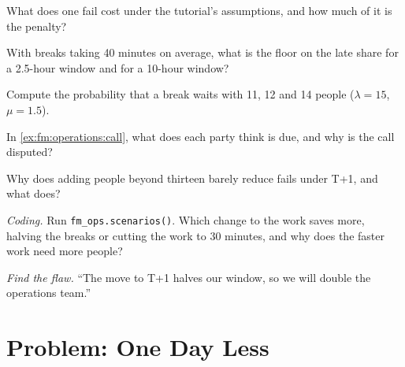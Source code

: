 \begin{exercise}[$\star$]\label{exo:fm:operations:2}
What does one fail cost under the tutorial's assumptions, and how much of it is the penalty?
\end{exercise}

\begin{exercise}[$\star$]\label{exo:fm:operations:3}
With breaks taking 40 minutes on average, what is the floor on the late share for a 2.5-hour window and for a 10-hour window?
\end{exercise}

\begin{exercise}[$\star\star$]\label{exo:fm:operations:4}
Compute the probability that a break waits with 11, 12 and 14 people ($\lambda=15$, $\mu=1.5$).
\end{exercise}

\begin{exercise}[$\star\star$]\label{exo:fm:operations:5}
In \cref{ex:fm:operations:call}, what does each party think is due, and why is the call disputed?
\end{exercise}

\begin{exercise}[$\star\star$]\label{exo:fm:operations:6}
Why does adding people beyond thirteen barely reduce fails under T+1, and what does?
\end{exercise}

\begin{exercise}[$\star\star\star$]\label{exo:fm:operations:7}
\emph{Coding.} Run \texttt{fm\_ops.scenarios()}. Which change to the work saves more, halving the breaks or cutting the work to 30 minutes, and
why does the faster work need more people?
\end{exercise}

\begin{exercise}[$\star\star\star$]\label{exo:fm:operations:8}
\emph{Find the flaw.} ``The move to T+1 halves our window, so we will double the operations team.''
\end{exercise}

\section{Problem: One Day Less}

